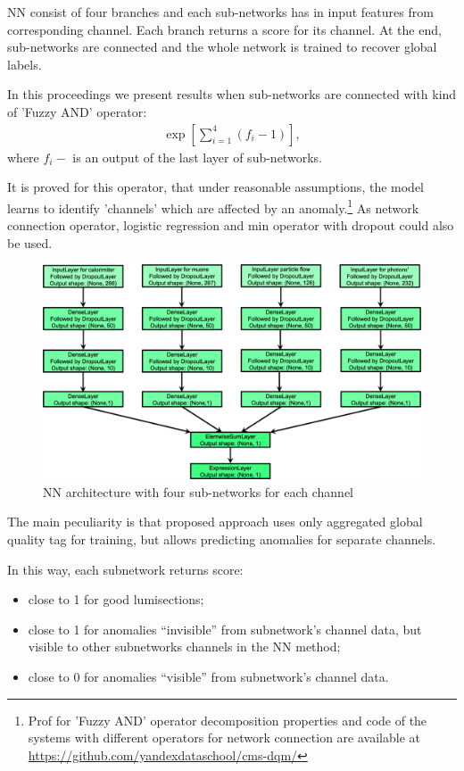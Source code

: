 \documentclass[a4paper]{jpconf}
\begin{document}
NN consist of four branches and each sub-networks has in input features from 
corresponding channel. Each branch returns a score for its channel. At the end, sub-networks are
connected and the whole network is trained to recover global labels.

In this proceedings we present results when sub-networks are connected with kind of 'Fuzzy AND' operator: \begin{eqnarray}
\exp [\sum_{i=1}^4(f_{i} - 1)],
\end{eqnarray}
where $f_{i} - $ is an output of the last layer of sub-networks. 

It is proved for this operator, that under reasonable assumptions, the model learns to identify 'channels' which are affected by an anomaly.\footnote{Prof for 'Fuzzy AND' operator decomposition properties and code of the systems with different operators for network connection are available at \url{https://github.com/yandexdataschool/cms-dqm/} } As network connection operator, logistic regression and min operator with dropout could also be used. 

\begin{figure}[h!]
\begin{center}
\includegraphics[width=5in]{figures/net.png}
\end{center}
\caption{\label{label}NN architecture with four sub-networks for each channel}
\end{figure}


The main peculiarity is that proposed approach uses only aggregated global quality tag for training, but allows predicting anomalies for separate channels.

In this way, each subnetwork returns score:
\begin{itemize}
\item close to 1 for good lumisections;
\item close to 1 for anomalies “invisible” from subnetwork’s channel data, but visible to other subnetworks channels in the NN method;
\item close to 0 for anomalies “visible” from subnetwork’s channel data.
\end{itemize}
\end{document}
